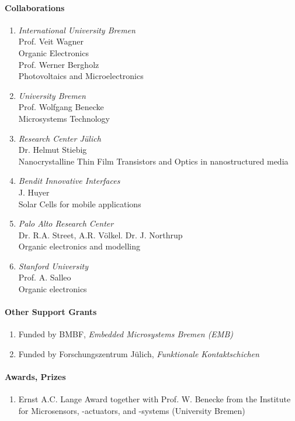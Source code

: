 \paragraph{Collaborations}
\begin{enumerate}
\item {\sl International University Bremen} \\ Prof. Veit Wagner \\ Organic Electronics
 \\ Prof. Werner Bergholz \\ Photovoltaics and Microelectronics
\item {\sl University Bremen} \\ Prof. Wolfgang Benecke \\ Microsystems Technology
\item {\sl Research Center J\"ulich} \\ Dr. Helmut Stiebig \\ Nanocrystalline Thin Film
  Transistors and Optics in nanostructured media
\item {\sl Bendit Innovative Interfaces} \\ J. Huyer \\ Solar Cells for mobile
  applications
\item {\sl Palo Alto Research Center} \\ Dr. R.A. Street, A.R. V\"olkel. Dr. J. Northrup
  \\ Organic electronics and modelling
\item {\sl Stanford University} \\ Prof. A. Salleo \\ Organic electronics

\end{enumerate}


\paragraph{Other Support Grants}
\begin{enumerate}
\item Funded by BMBF, \emph{Embedded Microsystems Bremen (EMB)}
\item Funded by Forschungszentrum J\"ulich, \emph{Funktionale Kontaktschichen}
\end{enumerate}


\paragraph{Awards, Prizes}
\begin{enumerate}
\item Ernst A.C. Lange Award together with Prof. W. Benecke from the Institute for
  Microsensors, -actuators, and -systems (University Bremen)
\end{enumerate}

